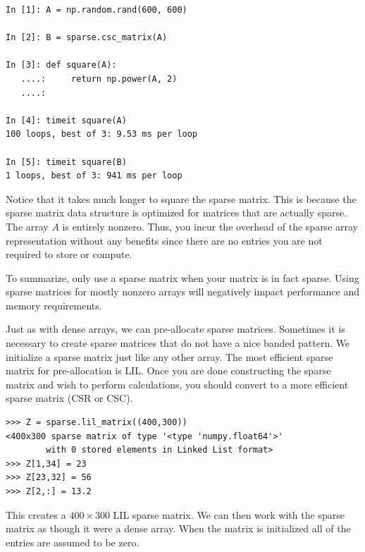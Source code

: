 \begin{lstlisting}
In [1]: A = np.random.rand(600, 600)

In [2]: B = sparse.csc_matrix(A)

In [3]: def square(A):
   ....:     return np.power(A, 2)
   ....: 

In [4]: timeit square(A)
100 loops, best of 3: 9.53 ms per loop

In [5]: timeit square(B)
1 loops, best of 3: 941 ms per loop
\end{lstlisting}

Notice that it takes much longer to square the sparse matrix.
This is because the sparse matrix data structure is optimized for matrices that are actually sparse. The array $A$ is entirely nonzero. Thus, you incur the overhead of the sparse array representation without any benefits since there are no entries you are not required to store or compute.

To summarize, only use a sparse matrix when your matrix is in fact sparse. Using sparse matrices for mostly nonzero arrays will negatively impact performance and memory requirements.

Just as with dense arrays, we can pre-allocate sparse matrices.
Sometimes it is necessary to create sparse matrices that do not have a nice banded pattern. We initialize a sparse matrix just like any other array. The most efficient sparse matrix for pre-allocation is LIL. Once you are done constructing the sparse matrix and wish to perform calculations, you should convert to a more efficient sparse matrix (CSR or CSC).


\begin{lstlisting}
>>> Z = sparse.lil_matrix((400,300))
<400x300 sparse matrix of type '<type 'numpy.float64'>'
        with 0 stored elements in Linked List format>
>>> Z[1,34] = 23
>>> Z[23,32] = 56
>>> Z[2,:] = 13.2
\end{lstlisting}

This creates a $400 \times 300$ LIL sparse matrix. We can then work with the sparse matrix as though it were a dense array.
When the matrix is initialized all of the entries are assumed to be zero. 
